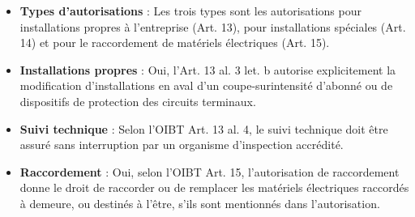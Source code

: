 \documentclass[a4paper,11pt,answers,addpoints]{exam}
\begin{document}
\begin{questions}
\begin{solution}
\begin{itemize}
	\item \textbf{Types d'autorisations} : Les trois types sont les autorisations pour installations propres à l'entreprise (Art. 13), pour installations spéciales (Art. 14) et pour le raccordement de matériels électriques (Art. 15).
	\item \textbf{Installations propres} : Oui, l'Art. 13 al. 3 let. b autorise explicitement la modification d'installations en aval d'un coupe-surintensité d'abonné ou de dispositifs de protection des circuits terminaux.
	\item \textbf{Suivi technique} :  Selon l'OIBT Art. 13 al. 4, le suivi technique doit être assuré sans interruption par un organisme d'inspection accrédité.
	\item \textbf{Raccordement} : Oui, selon l'OIBT Art. 15, l'autorisation de raccordement donne le droit de raccorder ou de remplacer les matériels électriques raccordés à demeure, ou destinés à l'être, s'ils sont mentionnés dans l'autorisation.
\end{itemize}
\end{solution}
\end{questions}
\end{document}
